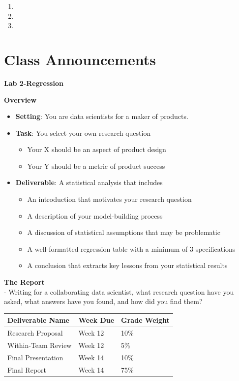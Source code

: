 \documentclass[
]{book}
\providecommand{\tightlist}{%
  \setlength{\itemsep}{0pt}\setlength{\parskip}{0pt}}
\theoremstyle{definition}
\theoremstyle{definition}
\theoremstyle{definition}
\theoremstyle{definition}
\theoremstyle{remark}
\begin{document}
\begin{enumerate}
\def\labelenumi{\arabic{enumi}.}
\tightlist
\item
\item
\item
\end{enumerate}

\hypertarget{class-announcements-9}{%
\section{Class Announcements}\label{class-announcements-9}}

\textbf{Lab 2-Regression}

\textbf{Overview}

\begin{itemize}
\tightlist
\item
  \textbf{Setting}: You are data scientists for a maker of products.
\item
  \textbf{Task}: You select your own research question

  \begin{itemize}
  \tightlist
  \item
    Your X should be an aspect of product design
  \item
    Your Y should be a metric of product success
  \end{itemize}
\item
  \textbf{Deliverable}: A statistical analysis that includes

  \begin{itemize}
  \tightlist
  \item
    An introduction that motivates your research question
  \item
    A description of your model-building process
  \item
    A discussion of statistical assumptions that may be problematic
  \item
    A well-formatted regression table with a minimum of 3 specifications
  \item
    A conclusion that extracts key lessons from your statistical results
  \end{itemize}
\end{itemize}

\textbf{The Report}\\
- Writing for a collaborating data scientist, what research question have you asked, what answers have you found, and how did you find them?

\begin{longtable}[]{@{}lll@{}}
\toprule
Deliverable Name & Week Due & Grade Weight \\
\midrule
\endhead
Research Proposal & Week 12 & 10\% \\
Within-Team Review & Week 12 & 5\% \\
Final Presentation & Week 14 & 10\% \\
Final Report & Week 14 & 75\% \\
\bottomrule
\end{longtable}
\end{document}
